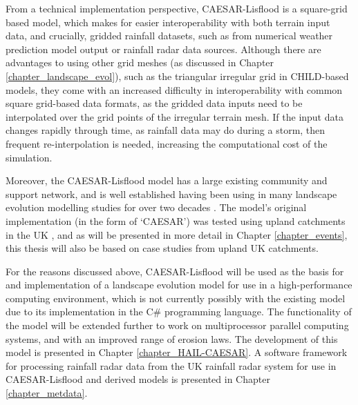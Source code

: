 From a technical implementation perspective, CAESAR-Lisflood is a square-grid based model, which makes for easier interoperability with both terrain input data, and crucially, gridded rainfall datasets, such as from numerical weather prediction model output or rainfall radar data sources. Although there are advantages to using other grid meshes (as discussed in Chapter \ref{chapter_landscape_evol}), such as the triangular irregular grid in CHILD-based models, they come with an increased difficulty in interoperability with common square grid-based data formats, as the gridded data inputs need to be interpolated over the grid points of the irregular terrain mesh. If the input data changes rapidly through time, as rainfall data may do during a storm, then frequent re-interpolation is needed, increasing the computational cost of the simulation.

%
Moreover, the CAESAR-Lisflood model has a large existing community and support network, and is well established having been using in many landscape evolution modelling studies for over two decades \citep{valters2016modelling}. The model's original implementation (in the form of `CAESAR') was tested using upland catchments in the UK \citep{coulthard1999modelling}, and as will be presented in more detail in Chapter \ref{chapter_events}, this thesis will also be based on case studies from upland UK catchments. 

For the reasons discussed above, CAESAR-Lisflood will be used as the basis for and implementation of a landscape evolution model for use in a high-performance computing environment, which is not currently possibly with the existing model due to its implementation in the C\# programming language. The functionality of the model will be extended further to work on multiprocessor parallel computing systems, and with an improved range of erosion laws. The development of this model is presented in Chapter \ref{chapter_HAIL-CAESAR}. A software framework for processing rainfall radar data from the UK rainfall radar system for use in CAESAR-Lisflood and derived models is presented in Chapter \ref{chapter_metdata}.

 
